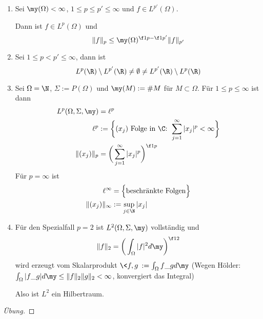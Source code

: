 \begin{st} \label{2.16}
	\begin{enumerate}[1)]
		\item
			Sei $\my(\Omega) < \infty$, $1 \le p \le p' \le \infty$ und $f \in L^{p'}(\Omega)$.

			Dann ist $f \in L^p(\Omega)$ und 
			\[
				\|f\|_p \le \my(\Omega)^{\f 1p - \f 1{p'}} \|f\|_{p'}
			\]
%				
		\item
			Sei $1 \le p < p' \le \infty$, dann ist
			\[
				L^p(\R) \setminus L^{p'}(\R) \neq \emptyset \neq L^{p'}(\R) \setminus L^p(\R)
			\]
		\item
			Sei $\Omega = \N$, $\Sigma := P(\Omega)$ und $\my(M) := \#M$ für $M \subset \Omega$.
			Für $1 \le p \le \infty$ ist dann
			\begin{align*}
				L^p(\Omega, \Sigma, \my) &= \ell^p \\
				\ell^p &:= \bigg\{ (x_j) \text{ Folge in $\C$: } \sum_{j=1}^\infty |x_j|^p < \infty \bigg\} \\
				\|(x_j)\|_p &= \bigg( \sum_{j=1}^\infty |x_j|^p \bigg)^{\f 1p}
			\end{align*}
			Für $p = \infty$ ist
			\begin{align*}
				\ell^\infty &= \Big\{ \text{beschränkte Folgen} \Big\} \\
				\|(x_j)\|_\infty &:= \sup_{j\in \N} |x_j|
			\end{align*}
		\item
			Für den Spezialfall $p=2$ ist $L^2(\Omega, \Sigma, \my)$ vollständig und
			\[
				\|f\|_2 = \bigg( \int_{\Omega} |f|^2 d\my \bigg)^{\f 12}
			\]
			wird erzeugt vom Skalarprodukt $\<f,g\> := \int_{\Omega} f \_g d\my$ (Wegen Hölder: $\int_{\Omega} |f \_g|d\my \le \|f\|_2 \|g\|_2 < \infty$, konvergiert das Integral)

			Also ist $L^2$ ein Hilbertraum.
	\end{enumerate}
	\begin{proof}[Übung]
	\end{proof}
\end{st}
